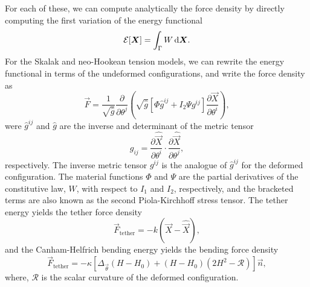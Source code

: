 For each of these, we can compute analytically the force density by directly
computing the first variation of the energy functional
\begin{equation}
    \mathcal{E}[\vec{X}] = \int_\Gamma W\mskip\thinmuskip\mathrm{d}\vec{X}.
\end{equation}
For the Skalak and neo-Hookean tension models, we can rewrite the energy
functional in terms of the undeformed configurations, and write the force
density as
\begin{equation}
    \vec{F} = \frac{1}{\sqrt{\hat{g}}}\frac{\partial}{\partial\theta^j}\left(\sqrt{\hat{g}}\left[\Phi \hat{g}^{ij} + I_2\Psi g^{ij}\right]\frac{\partial\vec{X}}{\partial\theta^i}\right),
\end{equation}
were $\hat{g}^{ij}$ and $\hat{g}$ are the inverse and determinant of the metric
tensor
\begin{equation}
    g_{ij} = \frac{\partial\hat{\vec{X}}}{\partial\theta^i}\cdot\frac{\partial\hat{\vec{X}}}{\partial\theta^j},
\end{equation}
respectively. The inverse metric tensor $g^{ij}$ is the analogue of $\hat{g}^{ij}$
for the deformed configuration. The material functions $\Phi$ and $\Psi$ are
the partial derivatives of the constitutive law, $W$, with respect to $I_1$
and $I_2$, respectively, and the bracketed terms are also known as the
second Piola-Kirchhoff stress tensor. The tether energy yields the tether
force density
\begin{equation}
    \vec{F}_\text{tether} = -k(\vec{X}-\hat{\vec{X}}),
\end{equation}
and the Canham-Helfrich bending energy yields the bending force density
\begin{equation}
\vec{F}_\text{tether} = -\kappa\left[\Delta_{\vec{\theta}}(H-H_0) + (H-H_0)(2H^2-\mathcal{R})\right]\vec{n},
\end{equation}
where, $\mathcal{R}$ is the scalar curvature of the deformed configuration.
